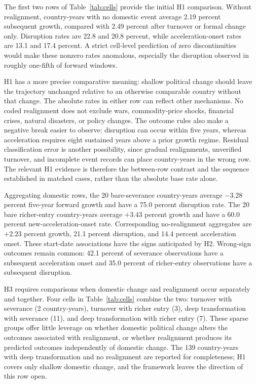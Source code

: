 \documentclass[11pt]{article}
\begin{document}
The first two rows of Table~\ref{tab:cells} provide the initial H1 comparison. Without realignment, country-years with no domestic event average 2.19 percent subsequent growth, compared with 2.49 percent after turnover or formal change only. Disruption rates are 22.8 and 20.8 percent, while acceleration-onset rates are 13.1 and 17.4 percent. A strict cell-level prediction of zero discontinuities would make these nonzero rates anomalous, especially the disruption observed in roughly one-fifth of forward windows.

H1 has a more precise comparative meaning: shallow political change should leave the trajectory unchanged relative to an otherwise comparable country without that change. The absolute rates in either row can reflect other mechanisms. No coded realignment does not exclude wars, commodity-price shocks, financial crises, natural disasters, or policy changes. The outcome rules also make a negative break easier to observe: disruption can occur within five years, whereas acceleration requires eight sustained years above a prior growth regime. Residual classification error is another possibility, since gradual realignments, unverified turnover, and incomplete event records can place country-years in the wrong row. The relevant H1 evidence is therefore the between-row contrast and the sequence established in matched cases, rather than the absolute base rate alone.

Aggregating domestic rows, the 20 bare-severance country-years average $-3.28$ percent five-year forward growth and have a 75.0 percent disruption rate. The 20 bare richer-entry country-years average $+3.43$ percent growth and have a 60.0 percent new-acceleration-onset rate. Corresponding no-realignment aggregates are $+2.23$ percent growth, 21.1 percent disruption, and 14.4 percent acceleration onset. These start-date associations have the signs anticipated by H2. Wrong-sign outcomes remain common: 42.1 percent of severance observations have a subsequent acceleration onset and 35.0 percent of richer-entry observations have a subsequent disruption.

H3 requires comparisons when domestic change and realignment occur separately and together. Four cells in Table~\ref{tab:cells} combine the two: turnover with severance (2 country-years), turnover with richer entry (3), deep transformation with severance (11), and deep transformation with richer entry (7). These sparse groups offer little leverage on whether domestic political change alters the outcomes associated with realignment, or whether realignment produces its predicted outcomes independently of domestic change. The 139 country-years with deep transformation and no realignment are reported for completeness; H1 covers only shallow domestic change, and the framework leaves the direction of this row open.
\end{document}
